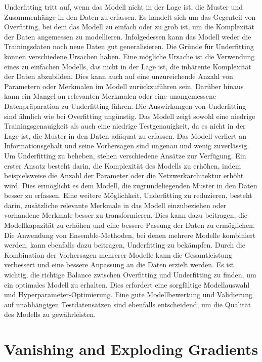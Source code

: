     Underfitting tritt auf, wenn das Modell nicht in der Lage ist, die  Muster und Zusammenhänge in den Daten zu erfassen. 
    Es handelt sich um das Gegenteil von Overfitting, bei dem das Modell zu einfach oder zu grob ist, um die Komplexität der Daten angemessen zu modellieren. 
    Infolgedessen kann das Modell weder die Trainingsdaten noch neue Daten gut generalisieren.
    Die Gründe für Underfitting können verschiedene Ursachen haben. Eine mögliche Ursache ist die Verwendung eines zu einfachen Modells, das nicht in der Lage ist, die inhärente Komplexität der Daten abzubilden. 
    Dies kann auch auf eine unzureichende Anzahl von Parametern oder Merkmalen im Modell zurückzuführen sein. Darüber hinaus kann ein Mangel an relevanten Merkmalen oder eine unangemessene Datenpräparation zu Underfitting führen.
    Die Auswirkungen von Underfitting sind ähnlich wie bei Overfitting ungünstig. 
    Das Modell zeigt sowohl eine niedrige Trainingsgenauigkeit als auch eine niedrige Testgenauigkeit, da es nicht in der Lage ist, die Muster in den Daten adäquat zu erfassen. 
    Das Modell verliert an Informationsgehalt und seine Vorhersagen sind ungenau und wenig zuverlässig.
    Um Underfitting zu beheben, stehen verschiedene Ansätze zur Verfügung. 
    Ein erster Ansatz besteht darin, die Komplexität des Modells zu erhöhen, indem beispielsweise die Anzahl der Parameter oder die Netzwerkarchitektur erhöht wird. 
    Dies ermöglicht es dem Modell, die zugrundeliegenden Muster in den Daten besser zu erfassen.
    Eine weitere Möglichkeit, Underfitting zu reduzieren, besteht darin, zusätzliche relevante Merkmale in das Modell einzubeziehen oder vorhandene Merkmale besser zu transformieren. 
    Dies kann dazu beitragen, die Modellkapazität zu erhöhen und eine bessere Passung der Daten zu ermöglichen.
    Die Anwendung von Ensemble-Methoden, bei denen mehrere Modelle kombiniert werden, kann ebenfalls dazu beitragen, Underfitting zu bekämpfen. Durch die Kombination der Vorhersagen mehrerer Modelle kann die Gesamtleistung verbessert und eine bessere Anpassung an die Daten erzielt werden.
    Es ist wichtig, die richtige Balance zwischen Overfitting und Underfitting zu finden, um ein optimales Modell zu erhalten. 
    Dies erfordert eine sorgfältige Modellauswahl und Hyperparameter-Optimierung. Eine gute Modellbewertung und Validierung auf unabhängigen Testdatensätzen sind ebenfalls entscheidend, um die Qualität des Modells zu gewährleisten.

\section{Vanishing and Exploding Gradients}


